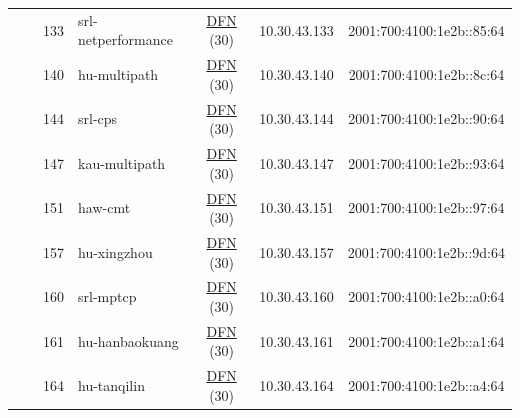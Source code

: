 \begin{small}
\begin{center}
\begin{longtable}{|c|c|c|c|c|c|c|c|}
  &  & \tiny{133} & \multicolumn{1}{|l|}{\tiny{srl-netperformance}} & \multicolumn{2}{|c|}{\tiny{\href{https://www.dfn.de}{DFN} (30)}} & \tiny{10.30.43.133} & \tiny{2001:700:4100:1e2b::85:64} \\* \cline{3-3}\cline{4-4}\cline{5-5}\cline{6-6}\cline{7-7}\cline{8-8}
  &  & \tiny{140} & \multicolumn{1}{|l|}{\tiny{hu-multipath}} & \multicolumn{2}{|c|}{\tiny{\href{https://www.dfn.de}{DFN} (30)}} & \tiny{10.30.43.140} & \tiny{2001:700:4100:1e2b::8c:64} \\* \cline{3-3}\cline{4-4}\cline{5-5}\cline{6-6}\cline{7-7}\cline{8-8}
  &  & \tiny{144} & \multicolumn{1}{|l|}{\tiny{srl-cps}} & \multicolumn{2}{|c|}{\tiny{\href{https://www.dfn.de}{DFN} (30)}} & \tiny{10.30.43.144} & \tiny{2001:700:4100:1e2b::90:64} \\* \cline{3-3}\cline{4-4}\cline{5-5}\cline{6-6}\cline{7-7}\cline{8-8}
  &  & \tiny{147} & \multicolumn{1}{|l|}{\tiny{kau-multipath}} & \multicolumn{2}{|c|}{\tiny{\href{https://www.dfn.de}{DFN} (30)}} & \tiny{10.30.43.147} & \tiny{2001:700:4100:1e2b::93:64} \\* \cline{3-3}\cline{4-4}\cline{5-5}\cline{6-6}\cline{7-7}\cline{8-8}
  &  & \tiny{151} & \multicolumn{1}{|l|}{\tiny{haw-cmt}} & \multicolumn{2}{|c|}{\tiny{\href{https://www.dfn.de}{DFN} (30)}} & \tiny{10.30.43.151} & \tiny{2001:700:4100:1e2b::97:64} \\* \cline{3-3}\cline{4-4}\cline{5-5}\cline{6-6}\cline{7-7}\cline{8-8}
  &  & \tiny{157} & \multicolumn{1}{|l|}{\tiny{hu-xingzhou}} & \multicolumn{2}{|c|}{\tiny{\href{https://www.dfn.de}{DFN} (30)}} & \tiny{10.30.43.157} & \tiny{2001:700:4100:1e2b::9d:64} \\* \cline{3-3}\cline{4-4}\cline{5-5}\cline{6-6}\cline{7-7}\cline{8-8}
  &  & \tiny{160} & \multicolumn{1}{|l|}{\tiny{srl-mptcp}} & \multicolumn{2}{|c|}{\tiny{\href{https://www.dfn.de}{DFN} (30)}} & \tiny{10.30.43.160} & \tiny{2001:700:4100:1e2b::a0:64} \\* \cline{3-3}\cline{4-4}\cline{5-5}\cline{6-6}\cline{7-7}\cline{8-8}
  &  & \tiny{161} & \multicolumn{1}{|l|}{\tiny{hu-hanbaokuang}} & \multicolumn{2}{|c|}{\tiny{\href{https://www.dfn.de}{DFN} (30)}} & \tiny{10.30.43.161} & \tiny{2001:700:4100:1e2b::a1:64} \\* \cline{3-3}\cline{4-4}\cline{5-5}\cline{6-6}\cline{7-7}\cline{8-8}
  &  & \tiny{164} & \multicolumn{1}{|l|}{\tiny{hu-tanqilin}} & \multicolumn{2}{|c|}{\tiny{\href{https://www.dfn.de}{DFN} (30)}} & \tiny{10.30.43.164} & \tiny{2001:700:4100:1e2b::a4:64} \\* \cline{3-3}\cline{4-4}\cline{5-5}\cline{6-6}\cline{7-7}\cline{8-8}

\end{longtable}
\end{center}
\end{small}
